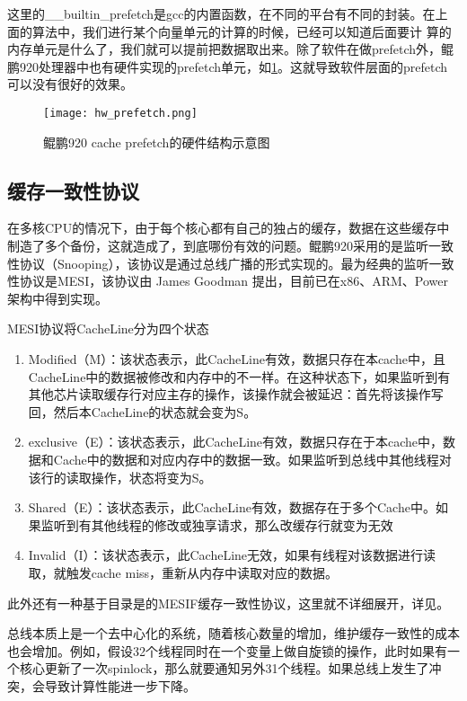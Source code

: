 这里的\_\_builtin\_prefetch是gcc的内置函数，在不同的平台有不同的封装。在上面的算法中，我们进行某个向量单元的计算的时候，已经可以知道后面要计 算的内存单元是什么了，我们就可以提前把数据取出来。除了软件在做prefetch外，鲲鹏920处理器中也有硬件实现的prefetch单元，如\ref{hw_prefetch}。这就导致软件层面的prefetch可以没有很好的效果。

\begin{figure}[htbp]
    \centering
    \texttt{[image: hw\_prefetch.png]}
    \caption{鲲鹏920 cache prefetch的硬件结构示意图\cite{kunpeng920pub}}
    \label{hw_prefetch}
\end{figure}

\subsection{缓存一致性协议}

在多核CPU的情况下，由于每个核心都有自己的独占的缓存，数据在这些缓存中制造了多个备份，这就造成了，到底哪份有效的问题。鲲鹏920采用的是监听一致性协议（Snooping），该协议是通过总线广播的形式实现的。最为经典的监听一致性协议是MESI，该协议由 James Goodman 提出，目前已在x86、ARM、Power架构中得到实现。

MESI协议将CacheLine分为四个状态
\begin{enumerate} \setlength{\itemsep}{0pt}
\item Modified（M）：该状态表示，此CacheLine有效，数据只存在本cache中，且CacheLine中的数据被修改和内存中的不一样。在这种状态下，如果监听到有其他芯片读取缓存行对应主存的操作，该操作就会被延迟：首先将该操作写回，然后本CacheLine的状态就会变为S。
\item exclusive（E）：该状态表示，此CacheLine有效，数据只存在于本cache中，数据和Cache中的数据和对应内存中的数据一致。如果监听到总线中其他线程对该行的读取操作，状态将变为S。
\item Shared（E）：该状态表示，此CacheLine有效，数据存在于多个Cache中。如果监听到有其他线程的修改或独享请求，那么改缓存行就变为无效
\item Invalid（I）：该状态表示，此CacheLine无效，如果有线程对该数据进行读取，就触发cache miss，重新从内存中读取对应的数据。

\end{enumerate}
此外还有一种基于目录是的MESIF缓存一致性协议，这里就不详细展开，详见\cite{husengseng2017}。

总线本质上是一个去中心化的系统，随着核心数量的增加，维护缓存一致性的成本也会增加。例如，假设32个线程同时在一个变量上做自旋锁的操作，此时如果有一个核心更新了一次spinlock，那么就要通知另外31个线程。如果总线上发生了冲突，会导致计算性能进一步下降。

